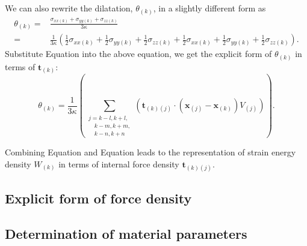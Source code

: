 \documentclass[11pt,fullpage]{article}
\newcommand{\mb}[1]{\mathbf{#1}}
\newcommand{\blue}[1]{{\color{blue}{{#1}}}}
\begin{document}
We can also rewrite the dilatation, $\theta_{(k)}$, in a slightly different form as
\begin{equation}
\begin{aligned}
\theta_{(k)} =& \frac{\sigma_{xx(k)}+\sigma_{yy(k)}+\sigma_{zz(k)}}{3\kappa}\\
        =& \frac{1}{3\kappa}(\frac{1}{2}\sigma_{xx(k)}+\frac{1}{2}\sigma_{yy(k)}+\frac{1}{2}\sigma_{zz(k)}
         + \frac{1}{2}\sigma_{xx(k)}+\frac{1}{2}\sigma_{yy(k)}+\frac{1}{2}\sigma_{zz(k)}).
\end{aligned}
\label{eq:18}
\end{equation}
Substitute Equation \blue{\ref{eq:9}} into the above equation, we get the explicit form of $\theta_{(k)}$ in terms of $\mb{t}_{(k)}$:
\begin{equation}
\theta_{(k)} = \frac{1}{3\kappa}\left(\sum_{\substack {j=k-l,k+l,\\ \quad k-m,k+m,\\ \quad k-n,k+n}}(\mb{t}_{(k)(j)}\cdot(\mb{x}_{(j)}-\mb{x}_{(k)})V_{(j)})\right).
\label{eq:19}
\end{equation}

Combining Equation \blue{\ref{eq:17}} and Equation \blue{\ref{eq:19}} leads to the representation of strain energy density $W_{(k)}$ in terms of internal force density $\mb{t}_{(k)(j)}$.

\subsection{Explicit form of force density}



\subsection{Determination of material parameters}



\end{document}
